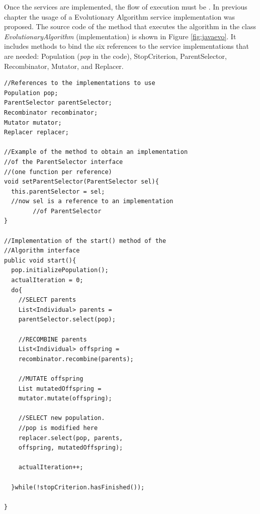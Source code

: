 Once the services are implemented, the flow of execution must be . In previous chapter the usage of a Evolutionary Algorithm service implementation was proposed. The source code of the method that executes the algorithm in the class
{\em EvolutionaryAlgorithm} (implementation) is shown in Figure
\ref{fig:javaevo}. It includes methods to bind the six references
to the service implementations that are needed: Population ({\em pop}
in the code), StopCriterion, ParentSelector, Recombinator, Mutator,
and Replacer.  %


\newsavebox{\mintedbox} %
\begin{lrbox}{\mintedbox}
\begin{minipage}{10cm}
\begin{verbatim}
//References to the implementations to use
Population pop;
ParentSelector parentSelector;
Recombinator recombinator;
Mutator mutator;
Replacer replacer;

//Example of the method to obtain an implementation
//of the ParentSelector interface 
//(one function per reference)
void setParentSelector(ParentSelector sel){
  this.parentSelector = sel;
  //now sel is a reference to an implementation 
        //of ParentSelector
}

//Implementation of the start() method of the 
//Algorithm interface
public void start(){
  pop.initializePopulation();
  actualIteration = 0;
  do{
    //SELECT parents
    List<Individual> parents = 
    parentSelector.select(pop);
      
    //RECOMBINE parents
    List<Individual> offspring = 
    recombinator.recombine(parents);
      
    //MUTATE offspring
    List mutatedOffspring = 
    mutator.mutate(offspring);
      
    //SELECT new population. 
    //pop is modified here
    replacer.select(pop, parents, 
    offspring, mutatedOffspring);
      
    actualIteration++;
      
  }while(!stopCriterion.hasFinished());
    
}
\end{verbatim}
\end{minipage}
\end{lrbox}

